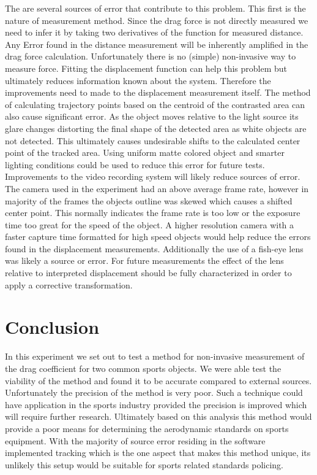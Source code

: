 \documentclass[paper=a4, fontsize=11pt, abstract=on]{scrartcl}
\numberwithin{equation}{section}		%
\numberwithin{figure}{section}			%
\numberwithin{table}{section}				%
\begin{document}
The are several sources of error that contribute to this problem. This first is the nature of measurement method. Since the drag force is not directly measured we need to infer it by taking two derivatives of the function for measured distance. Any Error found in the distance measurement will be inherently amplified in the drag force calculation. Unfortunately there is no (simple) non-invasive way to measure force. Fitting the displacement function can help this problem but ultimately reduces information known about the system. Therefore the improvements need to made to the displacement measurement itself. The method of calculating trajectory points based on the centroid of the contrasted area can also cause significant error. As the object moves relative to the light source its glare changes distorting the final shape of the detected area as white objects are not detected. This ultimately causes undesirable shifts to the calculated center point of the tracked area. Using uniform matte colored object and smarter lighting conditions could be used to reduce this error for future tests. Improvements to the video recording system will likely reduce sources of error. The camera used in the experiment had an above average frame rate, however in majority of the frames the objects outline was skewed which causes a shifted center point. This normally indicates the frame rate is too low or the exposure time too great for the speed of the object. A higher resolution camera with a faster capture time formatted for high speed objects would help reduce the errors found in the displacement measurements. Additionally the use of a fish-eye lens was likely a source or error. For future measurements the effect of the lens relative to interpreted displacement should be fully characterized in order to apply a corrective transformation. 
\section{Conclusion}
In this experiment we set out to test a method for non-invasive measurement of the drag coefficient for two common sports objects. We were able test the viability of the method and found it to be accurate compared to external sources. Unfortunately the precision of the method is very poor. Such a technique could have application in the sports industry provided the precision is improved which will require further research. Ultimately based on this analysis this method would provide a poor means for determining the aerodynamic standards on sports equipment. With the majority of source error residing in the software implemented tracking which is the one aspect that makes this method unique, its unlikely this setup would be suitable for sports related standards policing. 
\end{document}
